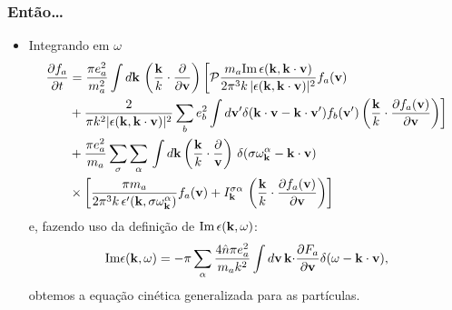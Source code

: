 \documentclass[10pt,aspectratio=1610,lualatex]{beamer}
\begin{document}
\begin{frame}
  \frametitle{Então\dots}
  \begin{itemize}
    \item Integrando em $\omega$
    \begin{equation*}
      \begin{split}
	\frac{\partial f_a}{\partial t}
	&=\frac{\pi e_a^2}{m_a^2} \int d{\bf k}\,
	\left( \frac{\bf k}{k}\cdot \frac{\partial}{\partial {\bf v}}
	\right) \biggl[\mathcal{P}
	\frac{m_a\mbox{Im}\,\epsilon({\bf k},{\bf k \cdot v})}
          {2\pi^3k\, |\epsilon({\bf k},{\bf k \cdot v})|^2}f_a({\bf v})\\
	&+\frac{2}{\pi k^2|\epsilon({\bf k},{\bf k \cdot v})|^2} \sum_b
	e_b^2\int d{\bf v'} \delta({\bf k \cdot v}-{\bf k\cdot v'})
	f_b({\bf v '})\left( \frac{\bf k}{k}\cdot
	  \frac{\partial f_a({\bf v})}{\partial {\bf v}}\right)\biggr]\\
	&+\frac{\pi e_a^2}{m_a}\sum_\sigma\sum_\alpha\,
	\int d{\bf k} \left( \frac{\bf k}{k} \cdot
	  \frac{\partial}{\bf v} \right)\,
	\delta(\sigma\omega_{\bf k}^\alpha-{\bf k \cdot v})\\
	&\times\left[ \frac{\pi m_a}{2\pi^3 k\,
	  \epsilon '({\bf k},\sigma\omega_{\bf k}^\alpha)}
	f_a({\bf v}) + I_{\bf k}^{\sigma \alpha}\,
	\left(\frac{\bf k}{k}\cdot
	  \frac{\partial f_a({\bf v})}{\partial {\bf v}}\right) \right]
      \end{split}
    \end{equation*}
    e, fazendo uso da definição de $\mbox{Im}\,\epsilon({\bf k},\omega)$:
    \begin{displaymath}
      \mbox{Im}\epsilon({\bf k},\omega)
      =-\pi \sum_\alpha \frac{4\hat n \pi e_a^2}{m_a k^2}
      \int d{\bf v}\,{\bf k \cdot}
      \frac{\partial F_a}{\partial {\bf v}}
      \delta(\omega-{\bf k\cdot v}),
    \end{displaymath}
    obtemos a equação cinética generalizada para as partículas.
  \end{itemize}
\end{frame}
\end{document}
